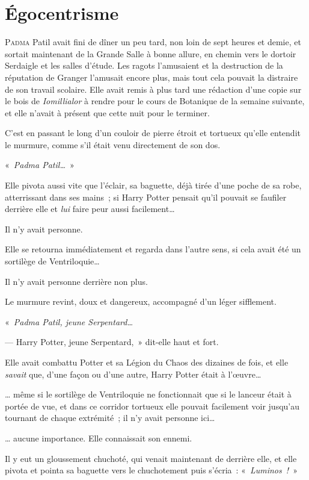 \chapter{Égocentrisme}

\lettrine{P}{adma} Patil avait fini de dîner un peu tard, non loin de sept heures et demie, et sortait maintenant de la Grande Salle à bonne allure, en chemin vers le dortoir Serdaigle et les salles d'étude. Les ragots l'amusaient et la destruction de la réputation de Granger l'amusait encore plus, mais tout cela pouvait la distraire de son travail scolaire. Elle avait remis à plus tard une rédaction d'une copie sur le bois de \emph{Iomillialor} à rendre pour le cours de Botanique de la semaine suivante, et elle n'avait à présent que cette nuit pour le terminer.

C'est en passant le long d'un couloir de pierre étroit et tortueux qu'elle entendit le murmure, comme s'il était venu directement de son dos.

«~\emph{Padma Patil…}~»

Elle pivota aussi vite que l'éclair, sa baguette, déjà tirée d'une poche de sa robe, atterrissant dans ses mains~; si Harry Potter pensait qu'il pouvait se faufiler derrière elle et \emph{lui} faire peur aussi facilement…

Il n'y avait personne.

Elle se retourna immédiatement et regarda dans l'autre sens, si cela avait été un sortilège de Ventriloquie…

Il n'y avait personne derrière non plus.

Le murmure revint, doux et dangereux, accompagné d'un léger sifflement.

«~\emph{Padma Patil, jeune Serpentard…}

--- Harry Potter, jeune Serpentard,~» dit-elle haut et fort.

Elle avait combattu Potter et sa Légion du Chaos des dizaines de fois, et elle \emph{savait} que, d'une façon ou d'une autre, Harry Potter était à l'œuvre…

… même si le sortilège de Ventriloquie ne fonctionnait que si le lanceur était à portée de vue, et dans ce corridor tortueux elle pouvait facilement voir jusqu'au tournant de chaque extrémité~; il n'y avait personne ici…

… aucune importance. Elle connaissait son ennemi.

Il y eut un gloussement chuchoté, qui venait maintenant de derrière elle, et elle pivota et pointa sa baguette vers le chuchotement puis s'écria~: «~\emph{Luminos~!}~»

